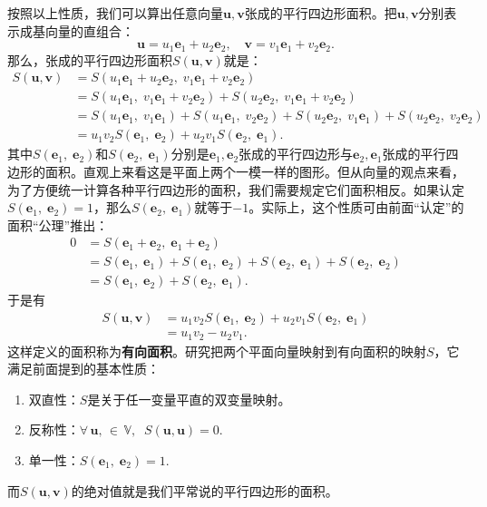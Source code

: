 \documentclass[12pt,UTF8]{ctexbook}
\begin{document}
按照以上性质，我们可以算出任意向量$\mathbf{u}, \mathbf{v}$张成的平行四边形面积。把$\mathbf{u}, \mathbf{v}$分别表示成基向量的直组合：
$$\mathbf{u} = u_1\mathbf{e}_1 + u_2\mathbf{e}_2, \quad \mathbf{v} = v_1\mathbf{e}_1 + v_2 \mathbf{e}_2. $$
那么，张成的平行四边形面积$S(\mathbf{u}, \mathbf{v})$就是：
\begin{align*}
    S(\mathbf{u}, \mathbf{v}) &= S(u_1\mathbf{e}_1 + u_2\mathbf{e}_2, \; v_1\mathbf{e}_1 + v_2 \mathbf{e}_2) \\
    &= S(u_1\mathbf{e}_1, \; v_1\mathbf{e}_1 + v_2 \mathbf{e}_2) + S(u_2\mathbf{e}_2, \; v_1\mathbf{e}_1 + v_2 \mathbf{e}_2) \\
    &= S(u_1\mathbf{e}_1, \; v_1\mathbf{e}_1) + S(u_1\mathbf{e}_1, \; v_2 \mathbf{e}_2) + S(u_2\mathbf{e}_2, \; v_1\mathbf{e}_1) + S(u_2\mathbf{e}_2, \; v_2 \mathbf{e}_2) \\
    &= u_1v_2 S(\mathbf{e}_1, \;\mathbf{e}_2) + u_2v_1 S(\mathbf{e}_2, \;\mathbf{e}_1).
\end{align*}
其中$S(\mathbf{e}_1, \;\mathbf{e}_2)$和$S(\mathbf{e}_2, \;\mathbf{e}_1)$分别是$\mathbf{e}_1, \mathbf{e}_2$张成的平行四边形与$\mathbf{e}_2, \mathbf{e}_1$张成的平行四边形的面积。直观上来看这是平面上两个一模一样的图形。但从向量的观点来看，为了方便统一计算各种平行四边形的面积，我们需要规定它们面积相反。如果认定$S(\mathbf{e}_1, \;\mathbf{e}_2) = 1$，那么$S(\mathbf{e}_2, \;\mathbf{e}_1)$就等于$-1$。实际上，这个性质可由前面“认定”的面积“公理”推出：
\begin{align*}
    0 &= S(\mathbf{e}_1 + \mathbf{e}_2, \;\mathbf{e}_1 + \mathbf{e}_2) \\
    &= S(\mathbf{e}_1, \;\mathbf{e}_1) + S(\mathbf{e}_1, \;\mathbf{e}_2) + S(\mathbf{e}_2, \;\mathbf{e}_1) + S(\mathbf{e}_2, \;\mathbf{e}_2) \\
    &= S(\mathbf{e}_1, \;\mathbf{e}_2) + S(\mathbf{e}_2, \;\mathbf{e}_1).
\end{align*}
于是有
\begin{align*}
    S(\mathbf{u}, \mathbf{v}) &= u_1v_2 S(\mathbf{e}_1, \;\mathbf{e}_2) + u_2v_1 S(\mathbf{e}_2, \;\mathbf{e}_1)\\
    &= u_1v_2 - u_2v_1.
\end{align*}
这样定义的面积称为\textbf{有向面积}。研究把两个平面向量映射到有向面积的映射$S$，它满足前面提到的基本性质：
\begin{enumerate}
    \item 双直性：$S$是关于任一变量平直的双变量映射。
    \item 反称性：$\forall \,\mathbf{u}, \, \in \, \mathbb{V}, \;\;S(\mathbf{u}, \mathbf{u}) = 0.$
    \item 单一性：$S(\mathbf{e}_1, \;\mathbf{e}_2) = 1.$
\end{enumerate}
而$S(\mathbf{u}, \mathbf{v})$的绝对值就是我们平常说的平行四边形的面积。
\end{document}
